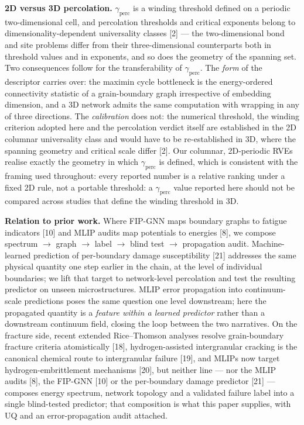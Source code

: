 \documentclass[preprint,12pt]{elsarticle}
\begin{document}
\textbf{2D versus 3D percolation.} $\gamma_{\mathrm{perc}}$ is a winding threshold defined on a periodic two-dimensional cell, and percolation thresholds and critical exponents belong to dimensionality-dependent universality classes [2] --- the two-dimensional bond and site problems differ from their three-dimensional counterparts both in threshold values and in exponents, and so does the geometry of the spanning set. Two consequences follow for the transferability of $\gamma_{\mathrm{perc}}$. The \textit{form} of the descriptor carries over: the maximin cycle bottleneck is the energy-ordered connectivity statistic of a grain-boundary graph irrespective of embedding dimension, and a 3D network admits the same computation with wrapping in any of three directions. The \textit{calibration} does not: the numerical threshold, the winding criterion adopted here and the percolation verdict itself are established in the 2D columnar universality class and would have to be re-established in 3D, where the spanning geometry and critical scale differ [2]. Our columnar, 2D-periodic RVEs realise exactly the geometry in which $\gamma_{\mathrm{perc}}$ is defined, which is consistent with the framing used throughout: every reported number is a relative ranking under a fixed 2D rule, not a portable threshold: a $\gamma_{\mathrm{perc}}$ value reported here should not be compared across studies that define the winding threshold in 3D.

\textbf{Relation to prior work.} Where FIP-GNN maps boundary graphs to fatigue indicators [10] and MLIP audits map potentials to energies [8], we compose spectrum $\rightarrow$ graph $\rightarrow$ label $\rightarrow$ blind test $\rightarrow$ propagation audit. Machine-learned prediction of per-boundary damage susceptibility [21] addresses the same physical quantity one step earlier in the chain, at the level of individual boundaries; we lift that target to network-level percolation and test the resulting predictor on unseen microstructures. MLIP error propagation into continuum-scale predictions poses the same question one level downstream; here the propagated quantity is a \textit{feature within a learned predictor} rather than a downstream continuum field, closing the loop between the two narratives. On the fracture side, recent extended Rice--Thomson analyses resolve grain-boundary fracture criteria atomistically [18], hydrogen-assisted intergranular cracking is the canonical chemical route to intergranular failure [19], and MLIPs now target hydrogen-embrittlement mechanisms [20], but neither line --- nor the MLIP audits [8], the FIP-GNN [10] or the per-boundary damage predictor [21] --- composes energy spectrum, network topology and a validated failure label into a single blind-tested predictor; that composition is what this paper supplies, with UQ and an error-propagation audit attached.
\end{document}

